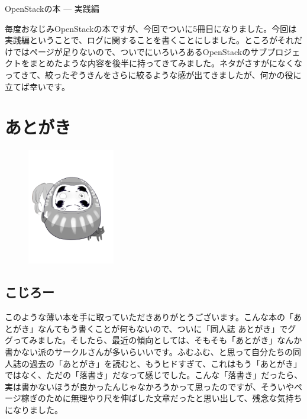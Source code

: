 \documentclass[9pt,b5paper,papersize,openany]{jsbook}
\begin{document}
{\Huge OpenStackの本 --- 実践編}

\vspace*{10mm}
\begin{minipage}{0.5\textwidth}
	\scriptsize 毎度おなじみOpenStackの本ですが、今回でついに5冊目になりました。今回は実践編ということで、ログに関することを書くことにしました。ところがそれだけではページが足りないので、ついでにいろいろあるOpenStackのサブプロジェクトをまとめたような内容を後半に持ってきてみました。ネタがさすがになくなってきて、絞ったぞうきんをさらに絞るような感が出てきましたが、何かの役に立てば幸いです。
\end{minipage}

\vspace*{-1truein}
\begin{minipage}{\textwidth}
	\tableofcontents
\end{minipage}

\thispagestyle{empty}





\chapter{あとがき}

\begin{figure}
	\vspace*{-14\intextsep}
	\begin{center}
		\includegraphics[width=0.34\textwidth]{img/daruma.png}
	\end{center}
\end{figure}

\section*{こじろー}

このような薄い本を手に取っていただきありがとうございます。こんな本の「あとがき」なんてもう書くことが何もないので、ついに「同人誌 あとがき」でググってみました。そしたら、最近の傾向としては、そもそも「あとがき」なんか書かない派のサークルさんが多いらいいです。ふむふむ、と思って自分たちの同人誌の過去の「あとがき」を読むと、もうヒドすぎて、これはもう「あとがき」ではなく、ただの「落書き」だなって感じでした。こんな「落書き」だったら、実は書かないほうが良かったんじゃなかろうかって思ったのですが、そういやページ稼ぎのために無理やり尺を伸ばした文章だったと思い出して、残念な気持ちになりました。
\end{document}
